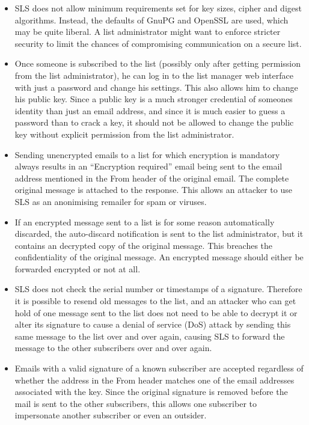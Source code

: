 \documentclass[a4]{article}
\begin{document}
\begin{itemize}
\item
SLS does not allow minimum requirements set for key sizes, cipher and digest algorithms.
Instead, the defaults of GnuPG and OpenSSL are used, which may be quite liberal.
A list administrator might want to enforce stricter security to limit the chances of compromising communication on a secure list.

\item
Once someone is subscribed to the list (possibly only after getting permission from the list administrator),
he can log in to the list manager web interface with just a password and change his settings.
This also allows him to change his public key.
Since a public key is a much stronger credential of someones identity than just an email address,
and since it is much easier to guess a password than to crack a key,
it should not be allowed to change the public key without explicit permission from the list administrator.

\item
Sending unencrypted emails to a list for which encryption is mandatory
always results in an ``Encryption required'' email being sent to the email address mentioned in the From header of the original email.
The complete original message is attached to the response.
This allows an attacker to use SLS as an anonimising remailer for spam or viruses.

\item
If an encrypted message sent to a list is for some reason automatically discarded,
the auto-discard notification is sent to the list administrator,
but it contains an decrypted copy of the original message.
This breaches the confidentiality of the original message.
An encrypted message should either be forwarded encrypted or not at all.

\item
SLS does not check the serial number or timestamps of a signature.
Therefore it is possible to resend old messages to the list, and
an attacker who can get hold of one message sent to the list does not need to be able to decrypt it or alter its signature
to cause a denial of service (DoS) attack by sending this same message to the list over and over again,
causing SLS to forward the message to the other subscribers over and over again.

\item
Emails with a valid signature of a known subscriber are accepted regardless of whether
the address in the From header matches one of the email addresses associated with the key.
Since the original signature is removed before the mail is sent to the other subscribers,
this allows one subscriber to impersonate another subscriber or even an outsider.


\end{itemize}
\end{document}
